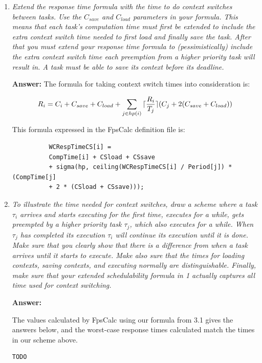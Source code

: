 \documentclass[a4paper,10pt]{article}
\DeclarePairedDelimiter{\ceil}{\lceil}{\rceil}
\newcommand{\answer}{\textbf{Answer: }}
\begin{document}
\begin{enumerate}
	\item \emph{Extend the response time formula with the time to do context switches between tasks. Use the $C_{save}$ and $C_{load}$ parameters in your formula. This means that each task's computation time must first be extended to include the extra context switch time needed to first load and finally save the task. After that you must extend your response time formula to (pessimistically) include the extra context switch time each preemption from a higher priority task will result in. A task must be able to save its context before its deadline.}
	
	\answer The formula for taking context switch times into consideration is:
	
	\begin{equation*}
	R_i = C_i + C_{save} + C_{load} + \sum_{j \in hp(i)}{\ceil{\frac{R_i}{T_j}} (C_j + 2(C_{save} + C_{load}))}
	\end{equation*}
	
	This formula expressed in the FpsCalc definition file is:
	
	\begin{lstlisting}
          WCRespTimeCS[i] =
          CompTime[i] + CSload + CSsave 
          + sigma(hp, ceiling(WCRespTimeCS[i] / Period[j]) * (CompTime[j]
          + 2 * (CSload + CSsave)));
	\end{lstlisting}
	
	\item \emph{To illustrate the time needed for context switches, draw a scheme where a task $\tau_i$ arrives and starts executing for the first time, executes for a while, gets preempted by a higher priority task $\tau_j$, which also executes for a while. When $\tau_j$ has completed its execution $\tau_i$ will continue its execution until it is done. Make sure that you clearly show that there is a difference from when a task arrives until it starts to execute. Make also sure that the times for loading contexts, saving contexts, and executing normally are distinguishable. Finally, make sure that your extended schedulability formula in 1 actually captures all time used for context switching.}
	
	\answer {}
	
	The values calculated by FpsCalc using our formula from 3.1 gives the answers below, and the worst-case response times calculated match the times in our scheme above.
	
\begin{lstlisting}[language=bash]
TODO
\end{lstlisting}
	

\end{enumerate}
\end{document}
